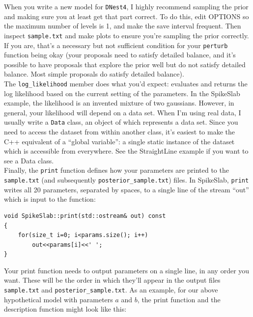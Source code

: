 \documentclass[a4paper, 11pt]{article}
\newcommand{\dnest}{{\tt DNest4}}
\begin{document}
When you write a new model for \dnest, I highly recommend sampling the prior
and making sure you at least get that part correct. To do this, edit OPTIONS
so the maximum number of levels is 1, and make the save interval frequent.
Then inspect {\tt sample.txt} and make plots to ensure you're sampling the
prior correctly. If you are, that's a necessary but not sufficient condition
for your {\tt perturb} function being okay (your proposals need to satisfy
detailed balance, and it's possible to have proposals that explore the prior
well but do not satisfy detailed balance. Most simple proposals do satisfy
detailed balance).\\

The {\tt log\_likelihood} member does what you'd expect: evaluates and returns
the log likelihood based on the current setting of the parameters. In the
SpikeSlab example, the likelihood is an invented mixture of two gaussians.
However, in general, your likelihood will depend on a data set. When I'm using
real data, I usually write a {\tt Data} class, an object of which represents
a data set. Since you need to access the dataset from within another class,
it's easiest to make the C++ equivalent of a ``global variable'': a single
static instance of the dataset which is accessible from everywhere. See
the StraightLine example if you want to see a Data class.\\

Finally, the {\tt print} function defines how your parameters are printed to the
{\tt sample.txt} (and subsequently {\tt posterior\_sample.txt}) files. In
SpikeSlab, {\tt print} writes all 20 parameters, separated by
spaces, to a single line of the stream ``out'' which is input to the function:\\

\begin{framed}
\begin{verbatim}
void SpikeSlab::print(std::ostream& out) const
{
    for(size_t i=0; i<params.size(); i++)
        out<<params[i]<<' ';
}
\end{verbatim}
\end{framed}

Your print function needs to output parameters on a single line, in any order
you want. These will be the order in which they'll appear in the output files
{\tt sample.txt} and {\tt posterior\_sample.txt}. As an example, for our
above hypothetical model with parameters $a$ and $b$, the print function
and the description function might look like this:
\end{document}
